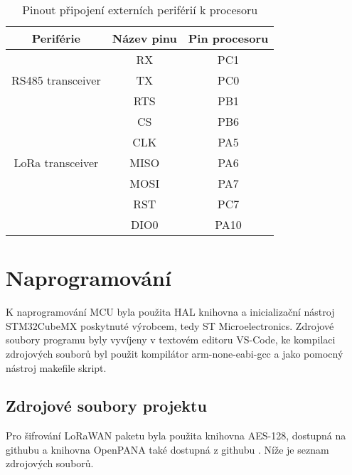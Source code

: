 \begin{table}[h]
    \centering
    \begin{tabular}{ |c|c|c| }
     \hline

     Periférie          & Název pinu & Pin procesoru           \\ \hline \hline
     
                        & RX  &   PC1            \\
    RS485 transceiver   & TX  &   PC0       \\
                        & RTS  &  PB1      \\     \hline

                        & CS    &  PB6             \\
                        & CLK   &  PA5        \\
   LoRa transceiver     & MISO  &  PA6     \\
                        & MOSI  &  PA7        \\
                        & RST   & PC7          \\
                        & DIO0  & PA10         \\
                        \hline

    \end{tabular}
    \caption{Pinout připojení externích periférií k procesoru}
    \label{table:3}
\end{table}

\section{Naprogramování}
K naprogramování MCU byla použita HAL knihovna a inicializační nástroj STM32CubeMX poskytnuté výrobcem, tedy ST Microelectronics.
Zdrojové soubory programu byly vyvíjeny v textovém editoru VS-Code, ke kompilaci zdrojových souborů byl použit kompilátor arm-none-eabi-gcc a jako pomocný nástroj makefile skript. 

\subsection{Zdrojové soubory projektu}
Pro šifrování LoRaWAN paketu byla použita knihovna AES-128, dostupná na githubu \cite{AESlib} a knihovna OpenPANA také dostupná z githubu \cite{CMAClib}.
Níže je seznam zdrojových souborů.

